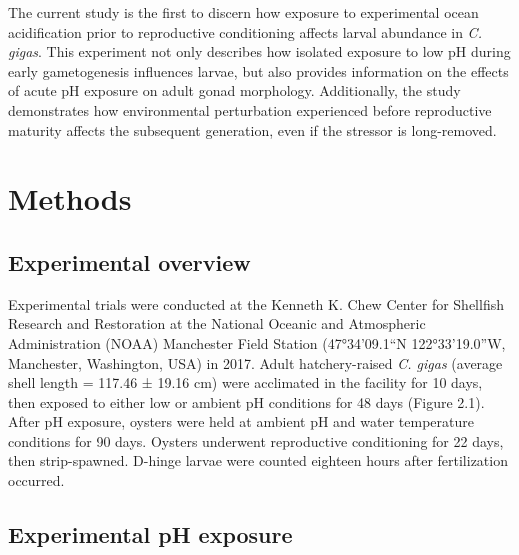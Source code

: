 \documentclass [11pt, proquest] {uwthesis}[2015/03/03]
\begin{document}
The current study is the first to discern how exposure to experimental ocean acidification prior to reproductive conditioning affects larval abundance in \emph{C. gigas}. This experiment not only describes how isolated exposure to low pH during early gametogenesis influences larvae, but also provides information on the effects of acute pH exposure on adult gonad morphology. Additionally, the study demonstrates how environmental perturbation experienced before reproductive maturity affects the subsequent generation, even if the stressor is long-removed.

\hypertarget{methods-1}{%
\section{Methods}\label{methods-1}}

\hypertarget{experimental-overview}{%
\subsection{Experimental overview}\label{experimental-overview}}

Experimental trials were conducted at the Kenneth K. Chew Center for Shellfish Research and Restoration at the National Oceanic and Atmospheric Administration (NOAA) Manchester Field Station (47°34'09.1``N 122°33'19.0''W, Manchester, Washington, USA) in 2017. Adult hatchery-raised \emph{C. gigas} (average shell length = 117.46 ± 19.16 cm) were acclimated in the facility for 10 days, then exposed to either low or ambient pH conditions for 48 days (Figure 2.1). After pH exposure, oysters were held at ambient pH and water temperature conditions for 90 days. Oysters underwent reproductive conditioning for 22 days, then strip-spawned. D-hinge larvae were counted eighteen hours after fertilization occurred.

\hypertarget{experimental-ph-exposure}{%
\subsection{Experimental pH exposure}\label{experimental-ph-exposure}}
\end{document}
